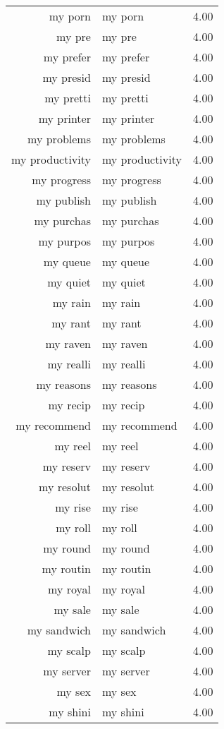 \begin{table}[ht]
\begin{tabular}{rlr}
  my porn & my porn & 4.00 \\ 
  my pre & my pre & 4.00 \\ 
  my prefer & my prefer & 4.00 \\ 
  my presid & my presid & 4.00 \\ 
  my pretti & my pretti & 4.00 \\ 
  my printer & my printer & 4.00 \\ 
  my problems & my problems & 4.00 \\ 
  my productivity & my productivity & 4.00 \\ 
  my progress & my progress & 4.00 \\ 
  my publish & my publish & 4.00 \\ 
  my purchas & my purchas & 4.00 \\ 
  my purpos & my purpos & 4.00 \\ 
  my queue & my queue & 4.00 \\ 
  my quiet & my quiet & 4.00 \\ 
  my rain & my rain & 4.00 \\ 
  my rant & my rant & 4.00 \\ 
  my raven & my raven & 4.00 \\ 
  my realli & my realli & 4.00 \\ 
  my reasons & my reasons & 4.00 \\ 
  my recip & my recip & 4.00 \\ 
  my recommend & my recommend & 4.00 \\ 
  my reel & my reel & 4.00 \\ 
  my reserv & my reserv & 4.00 \\ 
  my resolut & my resolut & 4.00 \\ 
  my rise & my rise & 4.00 \\ 
  my roll & my roll & 4.00 \\ 
  my round & my round & 4.00 \\ 
  my routin & my routin & 4.00 \\ 
  my royal & my royal & 4.00 \\ 
  my sale & my sale & 4.00 \\ 
  my sandwich & my sandwich & 4.00 \\ 
  my scalp & my scalp & 4.00 \\ 
  my server & my server & 4.00 \\ 
  my sex & my sex & 4.00 \\ 
  my shini & my shini & 4.00 \\ 

\end{tabular}
\end{table}
